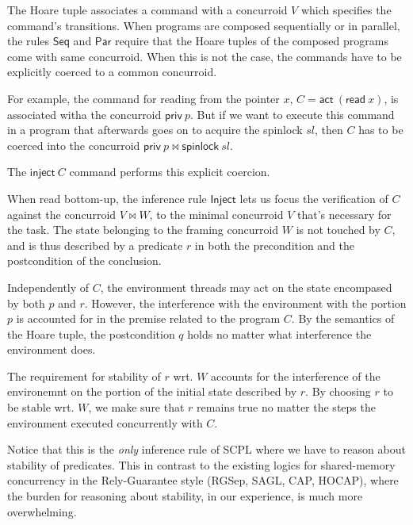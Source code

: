 The Hoare tuple associates a command with a concurroid $V$ which
specifies the command's transitions. When programs are composed
sequentially or in parallel, the rules $\mathsf{Seq}$ and
$\mathsf{Par}$ require that the Hoare tuples of the composed programs
come with same concurroid. When this is not the case, the commands
have to be explicitly coerced to a common concurroid.

For example, the command for reading from the pointer $x$, $C =
\mathsf{act}\ (\mathsf{read}\ x)$, is associated witha the concurroid
$\mathsf{priv}\ p$. But if we want to execute this command in a
program that afterwards goes on to acquire the spinlock $sl$, then $C$
has to be coerced into the concurroid $\mathsf{priv}\ p \bowtie
\mathsf{spinlock}\ sl$.

The $\mathsf{inject}\ C$ command performs this explicit coercion.

When read bottom-up, the inference rule $\mathsf{Inject}$ lets us
focus the verification of $C$ against the concurroid $V \bowtie W$, to
the minimal concurroid $V$ that's necessary for the task. The state
belonging to the framing concurroid $W$ is not touched by $C$, and is
thus described by a predicate $r$ in both the precondition and the
postcondition of the conclusion.

Independently of $C$, the environment threads may act on the state
encompased by both $p$ and $r$. However, the interference with the
environment with the portion $p$ is accounted for in the premise
related to the program $C$. By the semantics of the Hoare tuple, the
postcondition $q$ holds no matter what interference the environment
does.

The requirement for stability of $r$ wrt. $W$ accounts for the
interference of the environemnt on the portion of the initial state
described by $r$. By choosing $r$ to be stable wrt. $W$, we make sure
that $r$ remains true no matter the steps the environment executed
concurrently with $C$.

Notice that this is the \emph{only} inference rule of SCPL where we
have to reason about stability of predicates. This in contrast to the
existing logics for shared-memory concurrency in the Rely-Guarantee
style (RGSep, SAGL, CAP, HOCAP), where the burden for reasoning about
stability, in our experience, is much more overwhelming.



